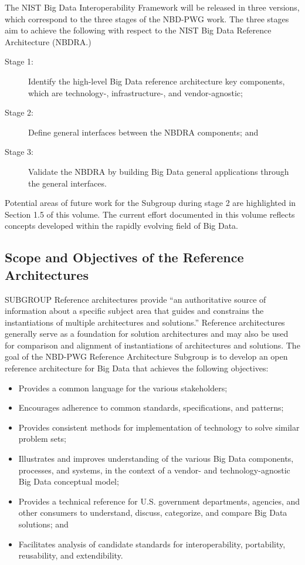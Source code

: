 \documentclass[11pt]{article}
\begin{document}
The NIST Big Data Interoperability Framework will be released in three versions, which correspond to 
the three stages of the NBD-PWG work. The three stages aim to achieve the following with respect to the 
NIST Big Data Reference Architecture (NBDRA.)
\begin{description}
\item[Stage 1:]	 Identify the high-level Big Data reference architecture key components, which are 
technology-, infrastructure-, and vendor-agnostic;
\item[Stage 2:]	 Define general interfaces between the NBDRA components; and
\item[Stage 3:]	 Validate the NBDRA by building Big Data general applications through the general 
interfaces.
\end{description}
Potential areas of future work for the Subgroup during stage 2 are highlighted in Section 1.5 of this 
volume. The current effort documented in this volume reflects concepts developed within the rapidly 
evolving field of Big Data.
\subsection{Scope and Objectives of the Reference Architectures }

SUBGROUP
Reference architectures provide “an authoritative source of information about a specific subject area that 
guides and constrains the instantiations of multiple architectures and solutions.”   Reference architectures 
generally serve as a foundation for solution architectures and may also be used for comparison and 
alignment of instantiations of architectures and solutions. 
The goal of the NBD-PWG Reference Architecture Subgroup is to develop an open reference architecture 
for Big Data that achieves the following objectives:

\begin{itemize}
\item	Provides a common language for the various stakeholders;
\item	Encourages adherence to common standards, specifications, and patterns;
\item	Provides consistent methods for implementation of technology to solve similar problem sets;
\item	Illustrates and improves understanding of the various Big Data components, processes, and 
systems, in the context of a vendor- and technology-agnostic Big Data conceptual model; 
\item	Provides a technical reference for U.S. government departments, agencies, and other consumers 
to understand, discuss, categorize, and compare Big Data solutions; and 
\item	Facilitates analysis of candidate standards for interoperability, portability, reusability, and 
extendibility.
\end{itemize}
\end{document}
